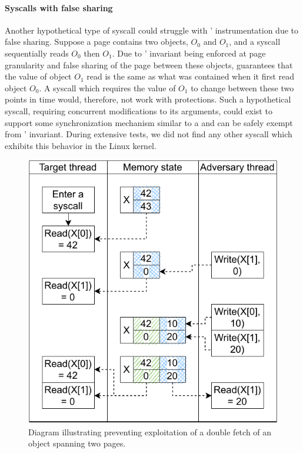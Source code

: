 \documentclass[letterpaper,twocolumn,10pt]{article}
\begin{document}
\paragraph{Syscalls with false sharing}
Another hypothetical type of syscall could struggle with \midas' 
instrumentation due to false sharing.
Suppose a page contains two objects, $O_0$ and $O_1$, and a syscall  
sequentially reads $O_0$ then $O_1$.
Due to \midas' invariant being enforced at page granularity and 
false sharing of the page between these objects, \midas guarantees that
the value of object $O_1$ read is the same as what was contained when it 
first read object $O_0$. 
A syscall which requires the value of $O_1$ to change between these two 
points in time would, therefore, not work with \midas protections. 
Such a hypothetical syscall, requiring concurrent modifications to its 
arguments, could exist to support some synchronization mechanism 
similar to a  and can be safely exempt from \midas' invariant.
%
During extensive tests, we did not find any other syscall which exhibits this behavior in the 
Linux kernel. 


\begin{figure}[]
  \centering
  \includegraphics[width=0.85\linewidth]{img/copy_two_pages.pdf}
  \caption{Diagram illustrating \midas preventing exploitation 
  of a double fetch of an object  spanning two pages.}
  \label{fig:copy_two_pages}
\end{figure}
\end{document}

